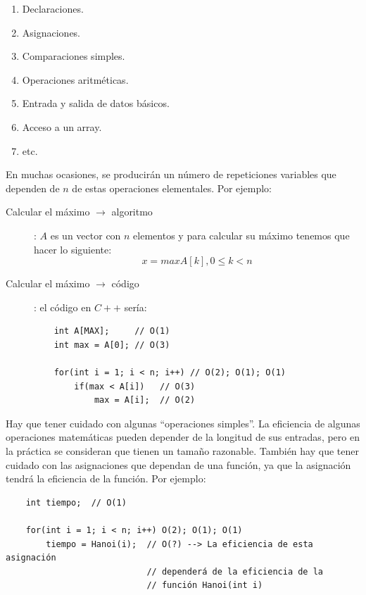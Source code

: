 \documentclass[10pt,a4paper,spanish]{report}
\theoremstyle{definition}
\theoremstyle{remark}
\begin{document}
    \begin{figure}
            
    \end{figure}    
    \begin{enumerate}[$\spadesuit$]
        \item Declaraciones.
        \item Asignaciones.
        \item Comparaciones simples.
        \item Operaciones aritméticas.
        \item Entrada y salida de datos básicos.
        \item Acceso a un array.
        \item etc.
    \end{enumerate}

    En muchas ocasiones, se producirán un número de repeticiones variables que dependen de $n$ de estas operaciones elementales. Por ejemplo:

    \begin{description}
        \item [Calcular el máximo $\rightarrow$ algoritmo]: $A$ es un vector con $n$ elementos y para calcular su máximo tenemos que hacer lo siguiente:
        \begin{displaymath}
            x = max{A[k], 0 \leq k < n}
        \end{displaymath}
        \item [Calcular el máximo $\rightarrow$ código]: el código en $C++$ sería:
\begin{verbatim}
    int A[MAX];     // O(1)
    int max = A[0]; // O(3)

    for(int i = 1; i < n; i++) // O(2); O(1); O(1)
        if(max < A[i])   // O(3)
            max = A[i];  // O(2)
\end{verbatim}
    \end{description}

    Hay que tener cuidado con algunas ``operaciones simples''. La eficiencia de algunas operaciones matemáticas pueden depender de la longitud de sus entradas, pero en la práctica se consideran que tienen un tamaño razonable. También hay que tener cuidado con las asignaciones que dependan de una función, ya que la asignación tendrá la eficiencia de la función. Por ejemplo:

\begin{verbatim}
    int tiempo;  // O(1)

    for(int i = 1; i < n; i++) O(2); O(1); O(1)
        tiempo = Hanoi(i);  // O(?) --> La eficiencia de esta asignación 
                            // dependerá de la eficiencia de la 
                            // función Hanoi(int i)
\end{verbatim}
\end{document}
